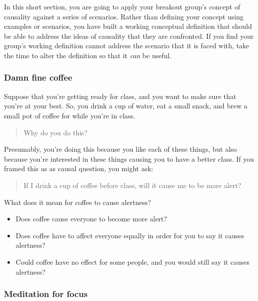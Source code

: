 \documentclass[
]{article}
\providecommand{\tightlist}{%
  \setlength{\itemsep}{0pt}\setlength{\parskip}{0pt}}
\begin{document}
In this short section, you are going to apply your breakout group's concept of causality against a series of scenarios. Rather than defining your concept using examples or scenarios, you have built a working conceptual definition that should be able to address the ideas of causality that they are confronted. If you find your group's working definition cannot address the scenario that it is faced with, take the time to alter the definition so that it \emph{can} be useful.

\hypertarget{damn-fine-coffee}{%
\subsubsection{Damn fine coffee}\label{damn-fine-coffee}}

Suppose that you're getting ready for class, and you want to make sure that you're at your best. So, you drink a cup of water, eat a small snack, and brew a small pot of coffee for while you're in class.

\begin{quote}
Why do you do this?
\end{quote}

Presumably, you're doing this because you like each of these things, but also because you're interested in these things causing you to have a better class. If you framed this as as causal question, you might ask:

\begin{quote}
If I drink a cup of coffee before class, will it cause me to be more alert?
\end{quote}

What does it mean for coffee to cause alertness?

\begin{itemize}
\tightlist
\item
  Does coffee cause everyone to become more alert?
\item
  Does coffee have to affect everyone equally in order for you to say it causes alertness?
\item
  Could coffee have no effect for some people, and you would still say it causes alertness?
\end{itemize}

\hypertarget{meditation-for-focus}{%
\subsubsection{Meditation for focus}\label{meditation-for-focus}}
\end{document}
